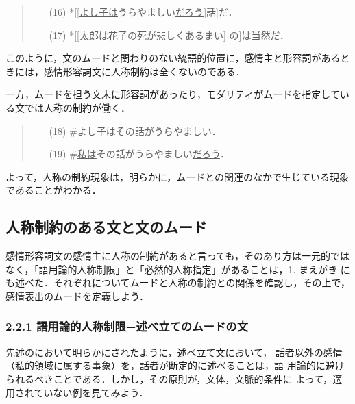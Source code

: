 \vspace{0.3cm}
\begin{quote}
\begin{itemize}
 \item[(16)] *[[\underline{よし子は}うらやましい\underline{だろう}]話]だ．
 \item[(17)] *[[\underline{太郎は}花子の死が悲しくある\underline{まい}]
	     の]は当然だ．
\end{itemize}
\end{quote}
\vspace{0.3cm}

このように，文のムードと関わりのない統語的位置に，感情主と形容詞があると
きには，感情形容詞文に人称制約は全くないのである．

一方，ムードを担う文末に形容詞があったり，モダリティがムードを指定してい
る文では人称の制約が働く．

\vspace{0.3cm}
\begin{quote}
\begin{itemize}
 \item[(18)] \#\underline{よし子は}その話が\underline{うらやましい}．
 \item[(19)] \#\underline{私は}その話がうらやましい\underline{だろう}．
\end{itemize}
\end{quote}
\vspace{0.3cm}

よって，人称の制約現象は，明らかに，ムードとの関連のなかで生じている現象
であることがわかる．

\subsection{人称制約のある文と文のムード}

感情形容詞文の感情主に人称の制約があると言っても，そのあり方は一元的では
なく，「語用論的人称制限」と「必然的人称指定」があることは，1. まえがき
にも述べた．それぞれについてムードと人称の制約との関係を確認し，その上で，
感情表出のムードを定義しよう．

\subsubsection{2.2.1 語用論的人称制限−述べ立てのムードの文}

先述の\cite{益岡1997}において明らかにされたように，述べ立て文において，
話者以外の感情（私的領域に属する事象）を，話者が断定的に述べることは，語
用論的に避けられるべきことである．しかし，その原則が，文体，文脈的条件に
よって，適用されていない例を見てみよう．

